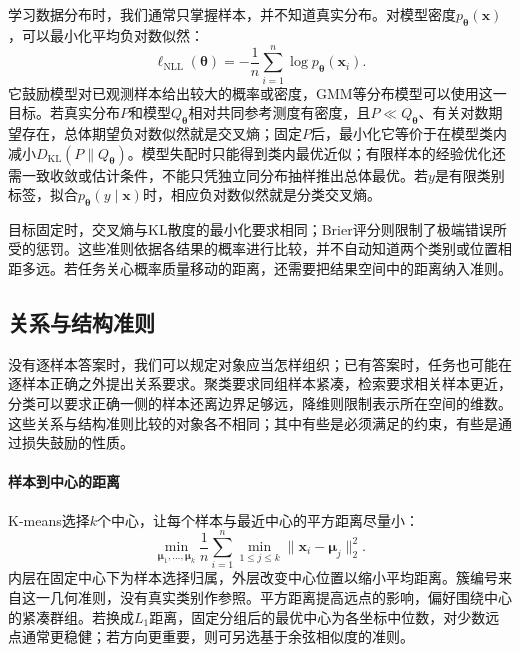 学习数据分布时，我们通常只掌握样本，并不知道真实分布。对模型密度$p_{\bm\theta}(\bm x)$，可以最小化平均负对数似然：
\begin{equation}
  \ell_{\mathrm{NLL}}(\bm{\theta})
  =-\frac{1}{n}\sum_{i=1}^{n}\log p_{\bm{\theta}}(\bm{x}_i).
  \label{eq:models-negative-log-likelihood}
\end{equation}
它鼓励模型对已观测样本给出较大的概率或密度，GMM等分布模型可以使用这一目标。若真实分布$P$和模型$Q_{\bm\theta}$相对共同参考测度有密度，且$P\ll Q_{\bm\theta}$、有关对数期望存在，总体期望负对数似然就是交叉熵；固定$P$后，最小化它等价于在模型类内减小$D_{\mathrm{KL}}(P\|Q_{\bm\theta})$。模型失配时只能得到类内最优近似；有限样本的经验优化还需一致收敛或估计条件，不能只凭独立同分布抽样推出总体最优。若$y$是有限类别标签，拟合$p_{\bm\theta}(y\mid\bm x)$时，相应负对数似然就是分类交叉熵。

目标固定时，交叉熵与KL散度的最小化要求相同；Brier评分则限制了极端错误所受的惩罚。这些准则依据各结果的概率进行比较，并不自动知道两个类别或位置相距多远。若任务关心概率质量移动的距离，还需要把结果空间中的距离纳入准则。

\subsection{关系与结构准则}
\label{sec:models-spatial-objectives}

没有逐样本答案时，我们可以规定对象应当怎样组织；已有答案时，任务也可能在逐样本正确之外提出关系要求。聚类要求同组样本紧凑，检索要求相关样本更近，分类可以要求正确一侧的样本还离边界足够远，降维则限制表示所在空间的维数。这些关系与结构准则比较的对象各不相同；其中有些是必须满足的约束，有些是通过损失鼓励的性质。

\paragraph{样本到中心的距离}

K-means选择$k$个中心，让每个样本与最近中心的平方距离尽量小：
\begin{equation}
  \min_{\bm{\mu}_1,\ldots,\bm{\mu}_k}
  \frac{1}{n}\sum_{i=1}^{n}\min_{1\leq j\leq k}
  \lVert\bm{x}_i-\bm{\mu}_j\rVert_2^2.
  \label{eq:models-kmeans-objective}
\end{equation}
内层在固定中心下为样本选择归属，外层改变中心位置以缩小平均距离。簇编号来自这一几何准则，没有真实类别作参照。平方距离提高远点的影响，偏好围绕中心的紧凑群组。若换成$L_1$距离，固定分组后的最优中心为各坐标中位数，对少数远点通常更稳健；若方向更重要，则可另选基于余弦相似度的准则。


